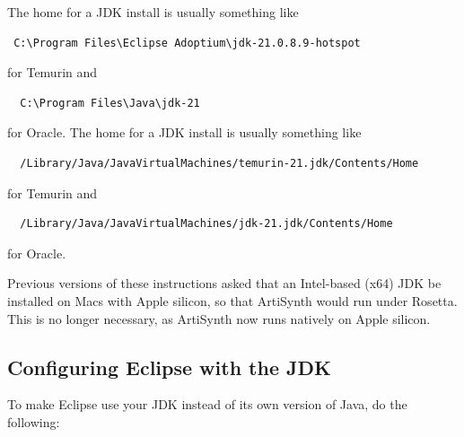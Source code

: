 \ifWindows
The home \directory{} for a JDK install is usually something like 
\begin{verbatim}
 C:\Program Files\Eclipse Adoptium\jdk-21.0.8.9-hotspot
\end{verbatim}
for Temurin and 
\begin{verbatim}
  C:\Program Files\Java\jdk-21
\end{verbatim}
for Oracle.
\fi
\ifMacOS
The home \directory{} for a JDK install is usually something like 
\begin{verbatim}
  /Library/Java/JavaVirtualMachines/temurin-21.jdk/Contents/Home
\end{verbatim}
for Temurin and 
\begin{verbatim}
  /Library/Java/JavaVirtualMachines/jdk-21.jdk/Contents/Home
\end{verbatim}
for Oracle.
\fi

\ifMacOS
\begin{sideblock}
Previous versions of these instructions asked that an Intel-based
({\sf x64}) JDK be installed on Macs with Apple silicon, so that
ArtiSynth would run under Rosetta. This is no longer necessary, as
ArtiSynth now runs natively on Apple silicon.
\end{sideblock}
\fi

\subsection{Configuring Eclipse with the JDK}

To make Eclipse use your JDK instead of its own version of Java, do the
following:

